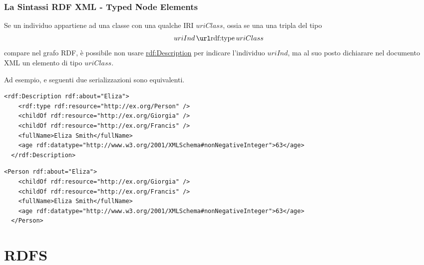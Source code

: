 \documentclass[8pt]{beamer}
\begin{document}
\begin{frame}[fragile]
 \frametitle{La Sintassi RDF XML - Typed Node Elements}
 
Se un individuo appartiene ad una classe con  
una qualche IRI $uriClass$, ossia se una una tripla del 
tipo
\[
 uriInd\,\mathurl{rdf:type}\,uriClass
\]
compare nel grafo RDF, \`e possibile non usare \url{rdf:Description}
per indicare l'individuo $uriInd$, ma al suo posto dichiarare
nel documento XML un elemento di tipo $uriClass$.
\vspace{\baselineskip}

Ad esempio, e seguenti due serializzazioni sono equivalenti.

\begin{Verbatim}[fontsize=\small]
  <rdf:Description rdf:about="Eliza">
    <rdf:type rdf:resource="http://ex.org/Person" />
    <childOf rdf:resource="http://ex.org/Giorgia" />
    <childOf rdf:resource="http://ex.org/Francis" />
    <fullName>Eliza Smith</fullName>
    <age rdf:datatype="http://www.w3.org/2001/XMLSchema#nonNegativeInteger">63</age>
  </rdf:Description>
\end{Verbatim}

\begin{Verbatim}[fontsize=\small]
  <Person rdf:about="Eliza">
    <childOf rdf:resource="http://ex.org/Giorgia" />
    <childOf rdf:resource="http://ex.org/Francis" />
    <fullName>Eliza Smith</fullName>
    <age rdf:datatype="http://www.w3.org/2001/XMLSchema#nonNegativeInteger">63</age>
  </Person>
\end{Verbatim}
\end{frame}

\section{RDFS}

\newcommand{\RDFSv}{\mathtt{RDFS}}
\end{document}
